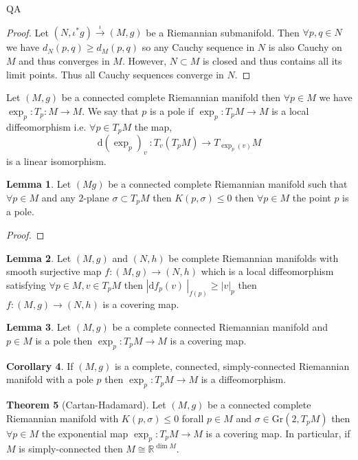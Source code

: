 QA	 \documentclass[12pt]{extarticle}
\newcommand{\R}{\mathbb{R}}
\renewcommand{\d}[1]{ \mathrm{d}#1 \:}
\theoremstyle{definition}
\newtheorem{theorem}{Theorem}[section]
\newtheorem{lemma}[theorem]{Lemma}
\newtheorem{corollary}[theorem]{Corollary}
\newenvironment{definition}[1][Definition:]{\begin{trivlist}
\item[\hskip \labelsep {\bfseries #1}]}{\end{trivlist}}
\begin{document}
\begin{proof}
Let $(N, \iota^* g) \xrightarrow{\iota} (M, g)$ be a Riemannian submanifold. Then $\forall p, q \in N$ we have $d_N(p, q) \ge d_M(p, q)$ so any Cauchy sequence in $N$ is also Cauchy on $M$ and thus converges in $M$. However, $N \subset M$ is closed and thus contains all its limit points. Thus all Cauchy sequences converge in $N$. 
\end{proof}

\begin{definition}
Let $(M, g)$ be a connected complete Riemannian manifold then $\forall p \in M$ we have $\exp_p : T_p : M \to M$. We say that $p$ is a pole if $\exp_p : T_p M \to M$ is a local diffeomorphism i.e. $\forall p \in T_p M$ the map,
\[ \d{(\exp_p)_v} : T_v (T_p M) \to T_{\exp_p(v)} M \]
is a linear isomorphism. 
\end{definition}

\begin{lemma}
Let $(M g)$ be a connected complete Riemannian manifold such that $\forall p \in M$ and any $2$-plane $\sigma \subset T_p M$ then $K(p, \sigma) \le 0$ then $\forall p \in M$ the point $p$ is a pole.
\end{lemma}

\begin{proof}

\end{proof}

\begin{lemma}
Let $(M, g)$ and $(N, h)$ be complete Riemannian manifolds with smooth surjective map $f : (M, g) \to (N, h)$ which is a local diffeomorphism satisfying $\forall p \in M, v \in T_p M$ then $|\d{f_p(v)} |_{f(p)} \ge |v|_p$ then $f : (M, g) \to (N, h)$ is a covering map. 
\end{lemma}

\begin{lemma}
Let $(M, g)$ be a complete connected Riemannian manifold and $p \in M$ is a pole then $\exp_p : T_p M \to M$ is a covering map. 
\end{lemma}

\begin{corollary}
If $(M, g)$ is a complete, connected, simply-connected Riemannian manifold with a pole $p$ then $\exp_p : T_p M \to M$ is a diffeomorphism. 
\end{corollary}

\begin{theorem}[Cartan-Hadamard]
Let $(M, g)$ be a connected complete Riemannian manifold with $K(p, \sigma) \le 0$ forall $p \in M$ and $\sigma \in \mathrm{Gr}(2, T_p M)$ then $\forall p \in M$ the exponential map $\exp_p : T_p M \to M$ is a covering map. In particular, if $M$ is simply-connected then $M \cong \R^{\dim{M}}$.  
\end{theorem}
\end{document}
